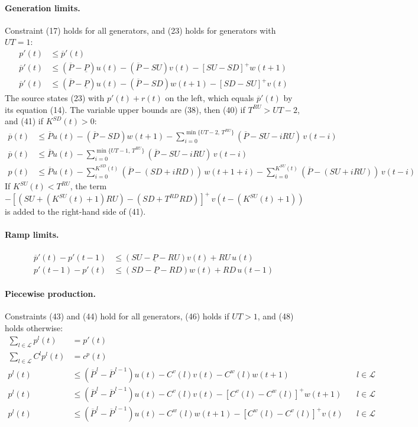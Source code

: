 \documentclass[11pt]{article}
\newcommand{\Pmax}{\overline{P}}
\newcommand{\Pmin}{\underline{P}}
\newcommand{\pbar}{\overline{p}}
\begin{document}
\paragraph{Generation limits.}
Constraint (17) holds for all generators, and (23) holds for generators with $UT=1$:
\begin{align}
p'(t) &\le \pbar'(t) \tag{17} \\
\pbar'(t) &\le (\Pmax-\Pmin)u(t) - (\Pmax-SU)v(t) - [SU-SD]^+ w(t+1) \tag{23a} \\
\pbar'(t) &\le (\Pmax-\Pmin)u(t) - (\Pmax-SD)w(t+1) - [SD-SU]^+ v(t) \tag{23b}
\end{align}
The source states (23) with $p'(t)+r(t)$ on the left, which equals $\pbar'(t)$ by its equation (14). The variable upper bounds are (38), then (40) if $T^{RU} > UT-2$, and (41) if $K^{SD}(t)>0$:
\begin{align}
\pbar(t) &\le \Pmax u(t) - (\Pmax-SD)w(t+1) - \sum_{i=0}^{\min\{UT-2,\,T^{RU}\}} (\Pmax-SU-iRU)\, v(t-i) \tag{38} \\
\pbar(t) &\le \Pmax u(t) - \sum_{i=0}^{\min\{UT-1,\,T^{RU}\}} (\Pmax-SU-iRU)\, v(t-i) \tag{40} \\
p(t) &\le \Pmax u(t) - \sum_{i=0}^{K^{SD}(t)} (\Pmax-(SD+iRD))\, w(t+1+i) - \sum_{i=0}^{K^{SU}(t)} (\Pmax-(SU+iRU))\, v(t-i) \tag{41}
\end{align}
If $K^{SU}(t) < T^{RU}$, the term $-[(SU+(K^{SU}(t)+1)RU) - (SD+T^{RD}RD)]^+\, v(t-(K^{SU}(t)+1))$ is added to the right-hand side of (41).

\paragraph{Ramp limits.}
\begin{align}
\pbar'(t) - p'(t-1) &\le (SU-\Pmin-RU)v(t) + RU\, u(t) \tag{35} \\
p'(t-1) - p'(t) &\le (SD-\Pmin-RD)w(t) + RD\, u(t-1) \tag{36}
\end{align}

\paragraph{Piecewise production.}
Constraints (43) and (44) hold for all generators, (46) holds if $UT>1$, and (48) holds otherwise:
\begin{align}
\sum_{l \in \mathcal{L}} p^l(t) &= p'(t) \tag{43} \\
\sum_{l \in \mathcal{L}} C^l p^l(t) &= c^p(t) \tag{44} \\
p^l(t) &\le (\Pmax^{\,l}-\Pmax^{\,l-1})u(t) - C^v(l)v(t) - C^w(l)w(t+1) && l \in \mathcal{L} \tag{46} \\
p^l(t) &\le (\Pmax^{\,l}-\Pmax^{\,l-1})u(t) - C^v(l)v(t) - [C^v(l)-C^w(l)]^+ w(t+1) && l \in \mathcal{L} \tag{48a} \\
p^l(t) &\le (\Pmax^{\,l}-\Pmax^{\,l-1})u(t) - C^w(l)w(t+1) - [C^w(l)-C^v(l)]^+ v(t) && l \in \mathcal{L} \tag{48b}
\end{align}
\end{document}
